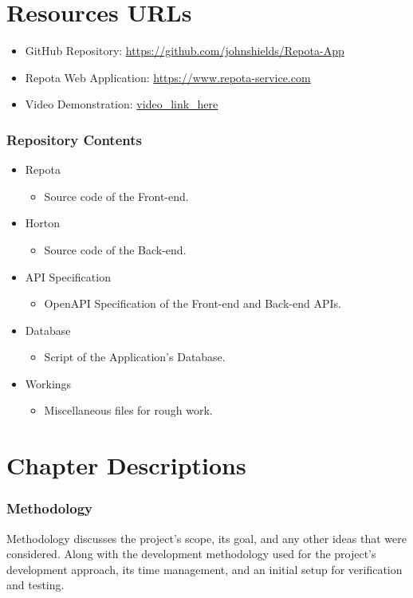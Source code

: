 \newpage
\section{Resources URLs}
\begin{itemize}
    \item GitHub Repository: 
    \url{https://github.com/johnshields/Repota-App}
    \item Repota Web Application: 
    \url{https://www.repota-service.com}
    \item Video Demonstration: 
    \url{video_link_here}
\end{itemize}

\subsubsection{Repository Contents}
\begin{itemize}
  \item Repota
    \begin{itemize}
    \item Source code of the Front-end.
    \end{itemize}
  \item Horton
    \begin{itemize}
    \item Source code of the Back-end.
    \end{itemize}
  \item API Specification
    \begin{itemize}
    \item OpenAPI Specification of the Front-end and Back-end APIs.
    \end{itemize}
  \item Database
    \begin{itemize}
    \item Script of the Application's Database.
    \end{itemize}
  \item Workings
    \begin{itemize}
    \item Miscellaneous files for rough work. 
    \end{itemize}
\end{itemize}

\newpage
\section{Chapter Descriptions}
\subsubsection{Methodology}
Methodology discusses the project's scope, its goal, and any other ideas that were considered. Along with the development methodology used for the project's development approach, its time management, and an initial setup for verification and testing.

